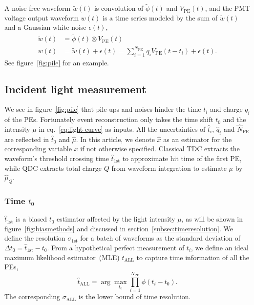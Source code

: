 A noise-free waveform $\tilde{w}(t)$ is convolution of $\tilde{\phi}(t)$ and $V_\mathrm{PE}(t)$, and the PMT voltage output waveform $w(t)$ is a time series modeled by the sum of $\tilde{w}(t)$ and a Gaussian white noise $\epsilon(t)$,
\begin{equation}
  \label{eq:1}
  \begin{aligned}
    \tilde{w}(t) &= \tilde{\phi}(t) \otimes V_\mathrm{PE}(t) \\
    w(t) &= \tilde{w}(t) + \epsilon(t) = \sum_{i=1}^{N_\mathrm{PE}} q_i V_\mathrm{PE}(t-t_i) + \epsilon(t).
  \end{aligned}
\end{equation}
See figure~\ref{fig:pile} for an example.


\subsection{Incident light measurement}
\label{sec:time}
We see in figure~\ref{fig:pile} that pile-ups and noises hinder the time $t_i$ and charge $q_i$ of the PEs. Fortunately event reconstruction only takes the time shift $t_0$ and the intensity $\mu$ in eq.~\eqref{eq:light-curve} as inputs.  All the uncertainties of $\hat{t}_i$, $\hat{q}_i$ and $\hat{N}_\mathrm{PE}$ are reflected in $\hat{t}_0$ and $\hat{\mu}$. In this article, we denote $\hat{x}$ as an estimator for the corresponding variable $x$ if not otherwise specified.  Classical TDC extracts the waveform's threshold crossing time $\hat{t}_\mathrm{1st}$ to approximate hit time of the first PE, while QDC extracts total charge $Q$ from waveform integration to estimate $\mu$ by $\hat{\mu}_Q$.

\subsubsection{Time $t_0$}
\label{sec:time-shift-t_0}

$\hat{t}_\mathrm{1st}$ is a biased $t_0$ estimator affected by the light intensity $\mu$, as will be shown in figure~\ref{fig:biasmethods} and discussed in section~\ref{subsec:timeresolution}. We define the resolution $\sigma_\mathrm{1st}$ for a batch of waveforms as the standard deviation of $\Delta t_0 = \hat{t}_\mathrm{1st} - t_0$. From a hypothetical perfect measurement of $t_i$, we define an ideal maximum likelihood estimator~(MLE) $\hat{t}_\mathrm{ALL}$ to capture time information of all the PEs,
\begin{equation}
  \label{eq:2}
  \hat{t}_\mathrm{ALL} = \arg\underset{t_0}{\max} \prod_{i=1}^{N_\mathrm{PE}} \phi(t_i-t_0).
\end{equation}
The corresponding $\sigma_\mathrm{ALL}$ is the lower bound of time resolution. 


